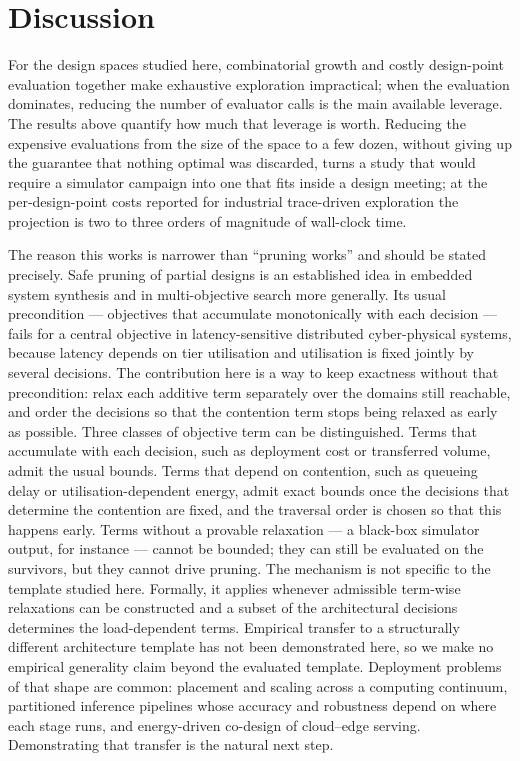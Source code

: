 \section{Discussion}
\label{sec:sn:discussion}

For the design spaces studied here, combinatorial growth and costly design-point
evaluation together make exhaustive exploration impractical; when the evaluation
dominates, reducing the number of evaluator calls is the main available leverage. The
results above quantify how much that leverage is worth. Reducing the expensive evaluations from the size of the
space to a few dozen, without giving up the guarantee that nothing optimal was discarded,
turns a study that would require a simulator campaign into one that fits inside a design
meeting; at the per-design-point costs reported for industrial trace-driven
exploration\cite{saadatmand2025compdse} the projection is two to three orders of
magnitude of wall-clock time.

The reason this works is narrower than ``pruning works'' and should be stated precisely.
Safe pruning of partial designs is an established idea in embedded system
synthesis\cite{neubauer2018exact,lukasiewycz2008symbolic} and in multi-objective search
more generally\cite{mandow2010namoa,paretopruning2022}. Its usual precondition ---
objectives that accumulate monotonically with each decision --- fails for a central objective in
latency-sensitive distributed cyber-physical systems, because latency depends on tier
utilisation and utilisation is fixed jointly by several decisions. The contribution here
is a way to keep exactness without that precondition: relax each additive term separately
over the domains still reachable, and order the decisions so that the contention term
stops being relaxed as early as possible. Three classes of objective term can be distinguished.
Terms that accumulate with each decision, such as deployment cost or transferred volume,
admit the usual bounds. Terms that depend on contention, such as queueing delay or
utilisation-dependent energy, admit exact bounds once the decisions that determine the
contention are fixed, and the traversal order is chosen so that this happens early. Terms
without a provable relaxation --- a black-box simulator output, for instance --- cannot be
bounded; they can still be evaluated on the survivors, but they cannot drive pruning.
The mechanism is not specific to the template
studied here. Formally, it applies whenever admissible term-wise relaxations can be constructed and a
subset of the architectural decisions determines the load-dependent terms. Empirical
transfer to a structurally different architecture template has not been demonstrated
here, so we make no empirical generality claim beyond the evaluated template. Deployment problems of that shape are common: placement and scaling
across a computing continuum\cite{filippini2026replica,predictive2026}, partitioned
inference pipelines whose accuracy and robustness depend on where each stage
runs\cite{guo2023,guo2025}, and energy-driven co-design of cloud--edge
serving\cite{cloud2026coopt}. Demonstrating that transfer is the natural next step.

